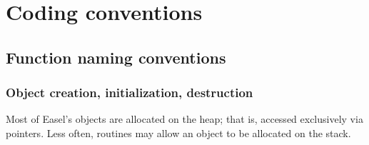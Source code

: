 \section{Coding conventions}

\subsection{Function naming conventions}

\subsubsection{Object creation, initialization, destruction}

Most of Easel's objects are allocated on the heap; that is, accessed
exclusively via pointers. Less often, routines may allow an object to
be allocated on the stack.

